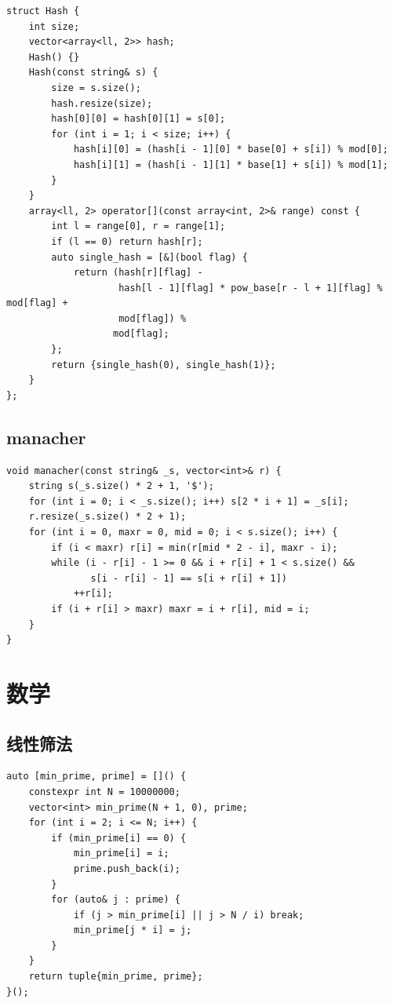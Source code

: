 \documentclass[UTF8]{ctexart}
\begin{document}
\begin{sloppypar}
\begin{lstlisting}[style=cpp]
struct Hash {
    int size;
    vector<array<ll, 2>> hash;
    Hash() {}
    Hash(const string& s) {
        size = s.size();
        hash.resize(size);
        hash[0][0] = hash[0][1] = s[0];
        for (int i = 1; i < size; i++) {
            hash[i][0] = (hash[i - 1][0] * base[0] + s[i]) % mod[0];
            hash[i][1] = (hash[i - 1][1] * base[1] + s[i]) % mod[1];
        }
    }
    array<ll, 2> operator[](const array<int, 2>& range) const {
        int l = range[0], r = range[1];
        if (l == 0) return hash[r];
        auto single_hash = [&](bool flag) {
            return (hash[r][flag] -
                    hash[l - 1][flag] * pow_base[r - l + 1][flag] % mod[flag] +
                    mod[flag]) %
                   mod[flag];
        };
        return {single_hash(0), single_hash(1)};
    }
};
\end{lstlisting}

\subsection{manacher}

\begin{lstlisting}[style=cpp]
void manacher(const string& _s, vector<int>& r) {
    string s(_s.size() * 2 + 1, '$');
    for (int i = 0; i < _s.size(); i++) s[2 * i + 1] = _s[i];
    r.resize(_s.size() * 2 + 1);
    for (int i = 0, maxr = 0, mid = 0; i < s.size(); i++) {
        if (i < maxr) r[i] = min(r[mid * 2 - i], maxr - i);
        while (i - r[i] - 1 >= 0 && i + r[i] + 1 < s.size() &&
               s[i - r[i] - 1] == s[i + r[i] + 1])
            ++r[i];
        if (i + r[i] > maxr) maxr = i + r[i], mid = i;
    }
}
\end{lstlisting}

\section{数学}

\subsection{线性筛法}

\begin{lstlisting}[style=cpp]
auto [min_prime, prime] = []() {
    constexpr int N = 10000000;
    vector<int> min_prime(N + 1, 0), prime;
    for (int i = 2; i <= N; i++) {
        if (min_prime[i] == 0) {
            min_prime[i] = i;
            prime.push_back(i);
        }
        for (auto& j : prime) {
            if (j > min_prime[i] || j > N / i) break;
            min_prime[j * i] = j;
        }
    }
    return tuple{min_prime, prime};
}();
\end{lstlisting}


\end{sloppypar}
\end{document}
